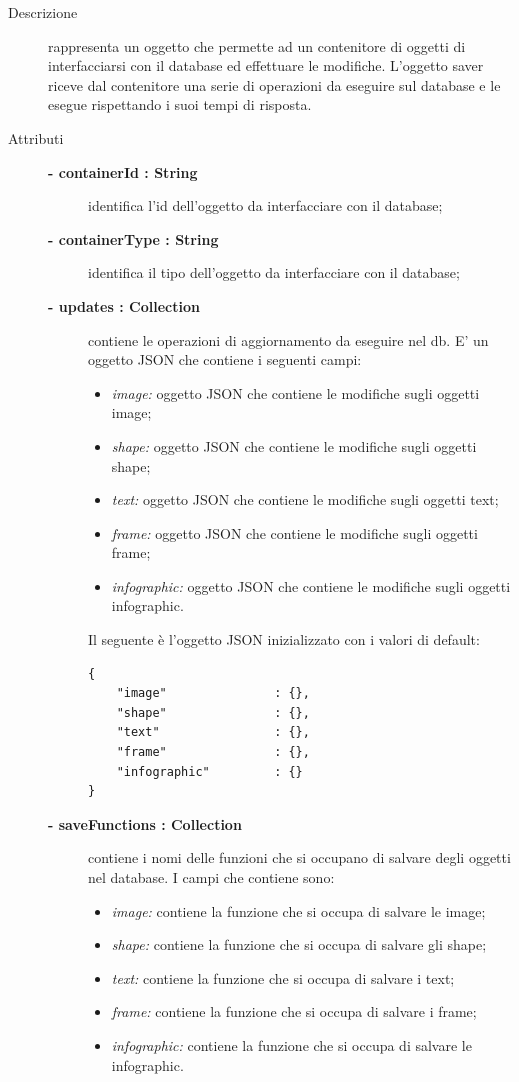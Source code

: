 \begin{description}
\item[Descrizione] \hfill
	rappresenta un oggetto che permette ad un contenitore di oggetti di interfacciarsi con il database ed effettuare le modifiche. L'oggetto saver riceve dal contenitore una serie di operazioni da eseguire sul database e le esegue rispettando i suoi tempi di risposta.
	
	
\item[Attributi] \hfill
	\begin{description}
		\item[\textbf{- containerId : String			}] \hfill
			identifica l'id dell'oggetto da interfacciare con il database;
		\item[\textbf{- containerType : String			}] \hfill
			identifica il tipo dell'oggetto da interfacciare con il database;
		\item[\textbf{- updates : Collection			}] \hfill
			contiene le operazioni di aggiornamento da eseguire nel db. E' un oggetto JSON che contiene i seguenti campi:
			\begin{itemize}
				\item \textit{image:} oggetto JSON che contiene le modifiche sugli oggetti image;
				\item \textit{shape:} oggetto JSON che contiene le modifiche sugli oggetti shape;
				\item \textit{text:} oggetto JSON che contiene le modifiche sugli oggetti text;
				\item \textit{frame:} oggetto JSON che contiene le modifiche sugli oggetti frame;
				\item \textit{infographic:} oggetto JSON che contiene le modifiche sugli oggetti infographic.
			\end{itemize}
			
			Il seguente è l'oggetto JSON inizializzato con i valori di default:
\begin{lstlisting}
{
    "image"               : {},
    "shape"               : {},
    "text"                : {},
    "frame"               : {},
    "infographic"         : {}    
}
\end{lstlisting}					

		\item[\textbf{- saveFunctions : Collection			}] \hfill
			contiene i nomi delle funzioni che si occupano di salvare degli oggetti nel database. I campi che contiene sono:
			\begin{itemize}
				\item \textit{image:} contiene la funzione che si occupa di salvare le image;
				\item \textit{shape:} contiene la funzione che si occupa di salvare gli shape;
				\item \textit{text:} contiene la funzione che si occupa di salvare i text;
				\item \textit{frame:} contiene la funzione che si occupa di salvare i frame;
				\item \textit{infographic:} contiene la funzione che si occupa di salvare le infographic.
			\end{itemize}


\end{description}
\end{description}
